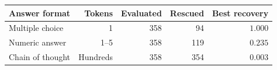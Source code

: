 \begin{tabular}{@{}lrrrr@{}}
\toprule
Answer format & Tokens & Evaluated & Rescued & Best recovery \\
\midrule
Multiple choice & 1 & 358 & 94 & $1.000$ \\
Numeric answer & 1--5 & 358 & 119 & $0.235$ \\
Chain of thought & Hundreds & 358 & 354 & $0.003$ \\
\bottomrule
\end{tabular}
